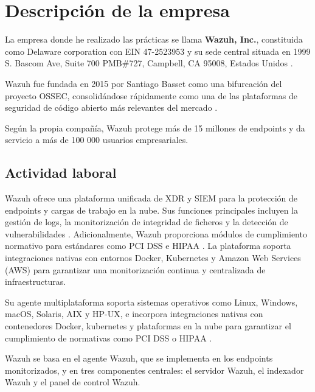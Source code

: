 \chapter{Descripción de la empresa}

La empresa donde he realizado las prácticas se llama \textbf{Wazuh, Inc.}, constituida como Delaware corporation con EIN 47-2523953 y su sede central situada en 1999 S. Bascom Ave, Suite 700 PMB\#727, Campbell, CA 95008, Estados Unidos \cite{wazuh_support_agreement}. 

Wazuh fue fundada en 2015 por Santiago Basset como una bifurcación del proyecto OSSEC, consolidándose rápidamente como una de las plataformas de seguridad de código abierto más relevantes del mercado \cite{wazuh_wikipedia_es}. 

Según la propia compañía, Wazuh protege más de 15 millones de endpoints y da servicio a más de 100 000 usuarios empresariales\cite{wazuh_homepage}. 

\section{Actividad laboral}
Wazuh ofrece una plataforma unificada de XDR y SIEM para la protección de endpoints y cargas de trabajo en la nube. Sus funciones principales incluyen la gestión de logs, la monitorización de integridad de ficheros y la detección de vulnerabilidades \cite{wazuh_homepage}\cite{wazuh_about_us}. Adicionalmente, Wazuh proporciona módulos de cumplimiento normativo para estándares como PCI DSS e HIPAA \cite{wazuh_regulatory_compliance}. La plataforma soporta integraciones nativas con entornos Docker, Kubernetes y Amazon Web Services (AWS) para garantizar una monitorización continua y centralizada de infraestructuras\cite{wazuh_agent_installation}.

Su agente multiplataforma soporta sistemas operativos como Linux, Windows, macOS, Solaris, AIX y HP-UX\cite{wazuh_agent_installation}, e incorpora integraciones nativas con contenedores Docker, kubernetes y plataformas en la nube para garantizar el cumplimiento de normativas como PCI DSS o HIPAA \cite{wazuh_regulatory_compliance}.

Wazuh se basa en el agente Wazuh, que se implementa en los endpoints monitorizados, y en tres componentes centrales: el servidor Wazuh, el indexador Wazuh y el panel de control Wazuh.

